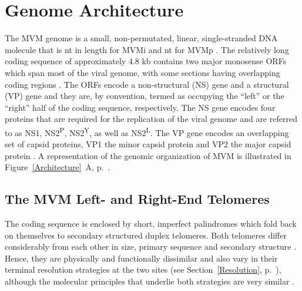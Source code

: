 
\chapter{Genome Architecture} %

\label{Chapter5} %





\label{sec: Architecture}
The MVM genome is a small, non-permutated, linear, single-stranded DNA molecule \cite{pmid789912, pmid225040, Genome1, Genome2} that is  nt in length for MVMi and  nt for MVMp \cite{pmid3502703}. The relatively long coding sequence of approximately 4.8 kb contains two major monosense ORFs which span most of the viral genome, with some sections having overlapping coding regions \cite{pmid6298737}. The ORFs encode a non-structural (NS) gene and a structural (VP) gene and they are, by convention, termed as occupying the ``left'' or the ``right'' half of the coding sequence, respectively. The NS gene encodes four proteins that are required for the replication of the viral genome and are referred to as NS1, NS2\textsuperscript{P}, NS2\textsuperscript{Y}, as well as NS2\textsuperscript{L}. The VP gene encodes an overlapping set of capsid proteins, VP1 the minor capsid protein and VP2 the major capsid protein \cite{pmid6828378, pmid2939261, pmid2942705}. A representation of the genomic organization of MVM is illustrated in Figure~\ref{Architecture}~A, p.~\pageref{Architecture}.   

\section{The MVM Left- and Right-End Telomeres}        

The coding sequence is enclosed by short, imperfect palindromes which fold back on themselves to secondary structured duplex telomeres. Both telomeres differ considerably from each other in size, primary sequence and secondary structure \cite{pmid6298737}. Hence, they are physically and functionally dissimilar and also vary in their terminal resolution strategies at the two sites (see Section~\ref{Resolution}, p.~\pageref{Resolution}), although the molecular principles that underlie both strategies are very similar \cite{encapsidation}. 

